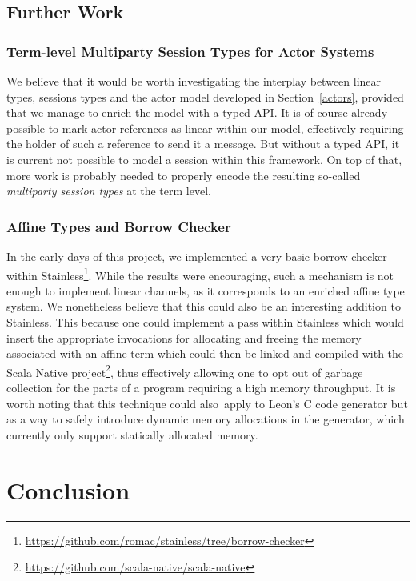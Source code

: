\documentclass[a4paper,twoside]{article}
\newcommand{\RefSec}[1]{Section~\ref{#1}}
\begin{document}
\subsection{Further Work}

\subsubsection*{Term-level Multiparty Session Types for Actor Systems}

We believe that it would be worth investigating the interplay between linear types, sessions types and the actor model developed in \RefSec{actors}, provided that we manage to enrich the model with a typed API. It is of course already possible to mark actor references as linear within our model, effectively requiring the holder of such a reference to send it a message. But without a typed API, it is current not possible to model a session within this framework. On top of that, more work is probably needed to properly encode the resulting so-called \textit{multiparty session types}\cite{DBLP:journals/corr/NeykovaY16} at the term level.

\subsubsection*{Affine Types and Borrow Checker}

In the early days of this project, we implemented a very basic borrow checker within Stainless\footnote{\url{https://github.com/romac/stainless/tree/borrow-checker}}. While the results were encouraging, such a mechanism is not enough to implement linear channels, as it corresponds to an enriched affine type system. We nonetheless believe that this could also be an interesting addition to Stainless. This because one could implement a pass within Stainless which would insert the appropriate invocations for allocating and freeing the memory associated with an affine term which could then be linked and compiled with the Scala Native project\footnote{\url{https://github.com/scala-native/scala-native}}, thus effectively allowing one to opt out of garbage collection for the parts of a program requiring a high memory throughput. It is worth noting that this technique could also apply to Leon's C code generator \cite{genc1, genc2} but as a way to safely introduce dynamic memory allocations in the generator, which currently only support statically allocated memory.

\clearpage
\section{Conclusion}
\label{conclusion}
\end{document}
